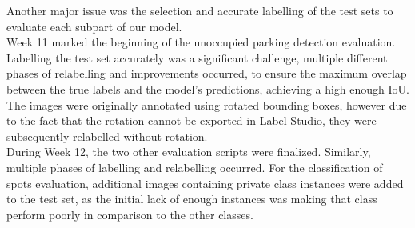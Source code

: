 Another major issue was the selection and accurate labelling of the test sets to
evaluate each subpart of our model.\\
Week 11 marked the beginning of the unoccupied parking detection evaluation. 
Labelling the test set accurately was a significant challenge, multiple different 
phases of relabelling and improvements occurred, to ensure the maximum overlap 
between the true labels and the model's predictions, achieving a high enough IoU.
The images were originally annotated using rotated bounding boxes, however due to the fact that
the rotation cannot be exported in Label Studio, they were subsequently relabelled without rotation.\\ 
During Week 12, the two other evaluation scripts were finalized. 
Similarly, multiple phases of labelling and relabelling occurred. For
the classification of spots evaluation, additional images containing private class instances
were added to the test set, as the initial lack of enough instances was making
that class perform poorly in comparison to the other classes.

\newpage{}